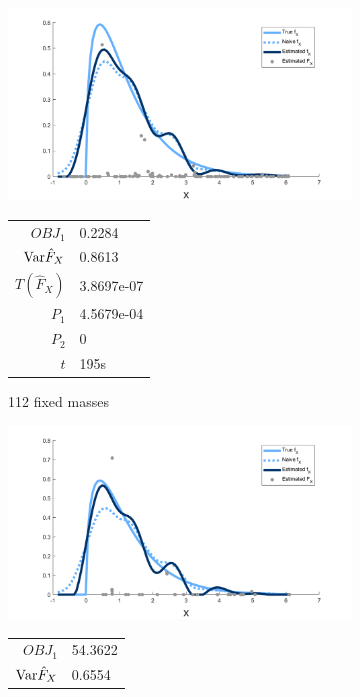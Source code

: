\begin{figure}
	\centering
	\begin{subfigure}[b]{0.49\textwidth}
		\centering
		\includegraphics[width = \textwidth]{Figures/Deconvolution/fixed_masses_example.png}
		\begin{tabular}{r l}
			$OBJ_1$ & 0.2284\\
			$\mathrm{Var} \hat{F}_X$ & 0.8613\\
			$T(\hat{F}_X)$ & 3.8697e-07\\
			$P_1$ & 4.5679e-04\\
			$P_2$ & 0\\
			$t$ & 195s
		\end{tabular}
		\caption{112 fixed masses}
		\label{fig:fixed masses example}
	\end{subfigure}
	\hfill
	\begin{subfigure}[b]{0.49\textwidth}
		\centering
		\includegraphics[width = \textwidth]{Figures/Deconvolution/moving_masses_m40_example.png}
		\begin{tabular}{r l}
			$OBJ_1$ & 54.3622\\
			$\mathrm{Var} \hat{F}_X$ & 0.6554\\

\end{tabular}
\end{subfigure}
\end{figure}
